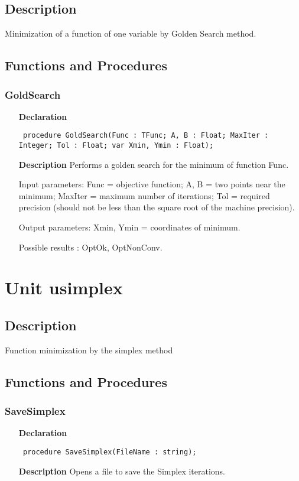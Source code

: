 \documentclass[12pt,a4paper,oneside]{report}
\newcommand{\declarationitem}[1]{\textbf{#1}}
\newcommand{\descriptiontitle}[1]{\textbf{#1}}
\newcommand{\code}[1]{\texttt{#1}}
\begin{document}
\subsection{Description}
Minimization of a function of one variable by Golden Search method.
\subsection{Functions and Procedures}
\subsubsection{GoldSearch}
\label{ugoldsrc-GoldSearch}
\begin{itemize}\item[\declarationitem{Declaration}\hfill]
	\begin{flushleft}
		\code{
			procedure GoldSearch(Func : TFunc; A, B : Float; MaxIter : Integer; Tol : Float; var Xmin, Ymin : Float);}
	\end{flushleft}
	\item[\descriptiontitle{Description}]
	Performs a golden search for the minimum of function Func.
	
	Input parameters: Func = objective function; A, B = two points near the minimum; MaxIter = maximum number of iterations; Tol = required precision (should not be less than the square root of the machine precision).
	
	Output parameters: Xmin, Ymin = coordinates of minimum.
	
	Possible results : OptOk, OptNonConv.
	
\end{itemize}
\section{Unit usimplex}
\label{usimplex}
\subsection{Description}
Function minimization by the simplex method 
\subsection{Functions and Procedures}
\subsubsection{SaveSimplex}
\label{usimplex-SaveSimplex}
\begin{itemize}\item[\declarationitem{Declaration}\hfill]
	\begin{flushleft}
		\code{
			procedure SaveSimplex(FileName : string);}
		
	\end{flushleft}
	
	\par
	\item[\descriptiontitle{Description}]
	Opens a file to save the Simplex iterations.
	
\end{itemize}
\end{document}
